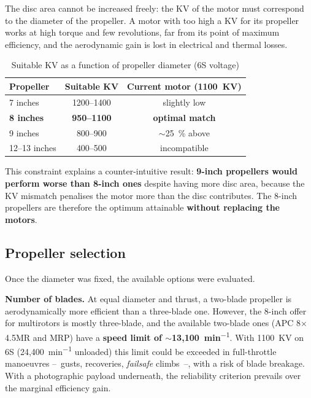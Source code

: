 The disc area cannot be increased freely: the KV of the motor must correspond to the diameter of the propeller. A motor with too high a KV for its propeller works at high torque and few revolutions, far from its point of maximum efficiency, and the aerodynamic gain is lost in electrical and thermal losses.

\begin{table}[H]
    \centering
    \caption{Suitable KV as a function of propeller diameter (6S voltage)}
    \label{tab:kv-compatibilitat}
    \begin{tabular}{lcc}
        \toprule
        Propeller & Suitable KV & Current motor (1100~KV) \\
        \midrule
        7 inches & 1200--1400 & slightly low \\
        \textbf{8 inches} & \textbf{950--1100} & \textbf{optimal match} \\
        9 inches & 800--900 & $\sim$25~\% above \\
        12--13 inches & 400--500 & incompatible \\
        \bottomrule
    \end{tabular}
\end{table}

This constraint explains a counter-intuitive result: \textbf{9-inch propellers would perform worse than 8-inch ones} despite having more disc area, because the KV mismatch penalises the motor more than the disc contributes. The 8-inch propellers are therefore the optimum attainable \textbf{without replacing the motors}.

\subsection{Propeller selection}
\label{subsec:propulsor-seleccio}

Once the diameter was fixed, the available options were evaluated.

\textbf{Number of blades.} At equal diameter and thrust, a two-blade propeller is aerodynamically more efficient than a three-blade one. However, the 8-inch offer for multirotors is mostly three-blade, and the available two-blade ones (APC 8$\times$4.5MR and MRP) have a \textbf{speed limit of $\sim$13,100~min\textsuperscript{$-1$}}. With 1100~KV on 6S (24,400~min\textsuperscript{$-1$} unloaded) this limit could be exceeded in full-throttle manoeuvres --~gusts, recoveries, \emph{failsafe} climbs~--, with a risk of blade breakage. With a photographic payload underneath, the reliability criterion prevails over the marginal efficiency gain.

